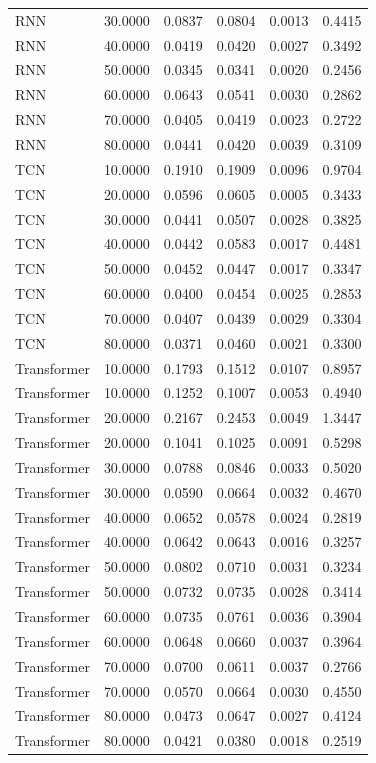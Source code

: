 \begin{tabular}{lrrrrr}
RNN & 30.0000 & 0.0837 & 0.0804 & 0.0013 & 0.4415 \\
RNN & 40.0000 & 0.0419 & 0.0420 & 0.0027 & 0.3492 \\
RNN & 50.0000 & 0.0345 & 0.0341 & 0.0020 & 0.2456 \\
RNN & 60.0000 & 0.0643 & 0.0541 & 0.0030 & 0.2862 \\
RNN & 70.0000 & 0.0405 & 0.0419 & 0.0023 & 0.2722 \\
RNN & 80.0000 & 0.0441 & 0.0420 & 0.0039 & 0.3109 \\
TCN & 10.0000 & 0.1910 & 0.1909 & 0.0096 & 0.9704 \\
TCN & 20.0000 & 0.0596 & 0.0605 & 0.0005 & 0.3433 \\
TCN & 30.0000 & 0.0441 & 0.0507 & 0.0028 & 0.3825 \\
TCN & 40.0000 & 0.0442 & 0.0583 & 0.0017 & 0.4481 \\
TCN & 50.0000 & 0.0452 & 0.0447 & 0.0017 & 0.3347 \\
TCN & 60.0000 & 0.0400 & 0.0454 & 0.0025 & 0.2853 \\
TCN & 70.0000 & 0.0407 & 0.0439 & 0.0029 & 0.3304 \\
TCN & 80.0000 & 0.0371 & 0.0460 & 0.0021 & 0.3300 \\
Transformer & 10.0000 & 0.1793 & 0.1512 & 0.0107 & 0.8957 \\
Transformer & 10.0000 & 0.1252 & 0.1007 & 0.0053 & 0.4940 \\
Transformer & 20.0000 & 0.2167 & 0.2453 & 0.0049 & 1.3447 \\
Transformer & 20.0000 & 0.1041 & 0.1025 & 0.0091 & 0.5298 \\
Transformer & 30.0000 & 0.0788 & 0.0846 & 0.0033 & 0.5020 \\
Transformer & 30.0000 & 0.0590 & 0.0664 & 0.0032 & 0.4670 \\
Transformer & 40.0000 & 0.0652 & 0.0578 & 0.0024 & 0.2819 \\
Transformer & 40.0000 & 0.0642 & 0.0643 & 0.0016 & 0.3257 \\
Transformer & 50.0000 & 0.0802 & 0.0710 & 0.0031 & 0.3234 \\
Transformer & 50.0000 & 0.0732 & 0.0735 & 0.0028 & 0.3414 \\
Transformer & 60.0000 & 0.0735 & 0.0761 & 0.0036 & 0.3904 \\
Transformer & 60.0000 & 0.0648 & 0.0660 & 0.0037 & 0.3964 \\
Transformer & 70.0000 & 0.0700 & 0.0611 & 0.0037 & 0.2766 \\
Transformer & 70.0000 & 0.0570 & 0.0664 & 0.0030 & 0.4550 \\
Transformer & 80.0000 & 0.0473 & 0.0647 & 0.0027 & 0.4124 \\
Transformer & 80.0000 & 0.0421 & 0.0380 & 0.0018 & 0.2519 \\
\bottomrule
\end{tabular}
